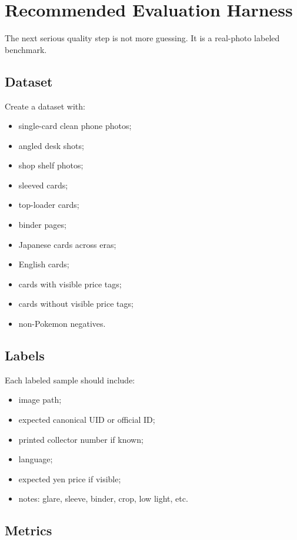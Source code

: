 \documentclass[11pt,a4paper]{article}
\begin{document}
\section{Recommended Evaluation Harness}

The next serious quality step is not more guessing. It is a real-photo labeled benchmark.

\subsection{Dataset}

Create a dataset with:

\begin{itemize}
  \item single-card clean phone photos;
  \item angled desk shots;
  \item shop shelf photos;
  \item sleeved cards;
  \item top-loader cards;
  \item binder pages;
  \item Japanese cards across eras;
  \item English cards;
  \item cards with visible price tags;
  \item cards without visible price tags;
  \item non-Pokemon negatives.
\end{itemize}

\subsection{Labels}

Each labeled sample should include:

\begin{itemize}
  \item image path;
  \item expected canonical UID or official ID;
  \item printed collector number if known;
  \item language;
  \item expected yen price if visible;
  \item notes: glare, sleeve, binder, crop, low light, etc.
\end{itemize}

\subsection{Metrics}
\end{document}
